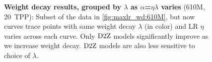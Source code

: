 \begin{figure}
  \centering
  \vspace{0mm}
  \caption{\textbf{Weight decay results, grouped by $\lambda$ as
      $\alpha$=$\eta\lambda$ varies} (610M, 20~TPP):
    Subset of the data in \cref{fig:maxlr_wd:610M}, but now curves
    trace points with same weight decay $\lambda$ (in color) and LR
    $\eta$ varies across each curve.  Only $\mbox{D2Z}$ models
    significantly improve as we increase weight decay.  $\mbox{D2Z}$ models
    are also less sensitive to choice of
    $\lambda$.\label{fig:maxlr_wdgroups:610M}}
\end{figure}
